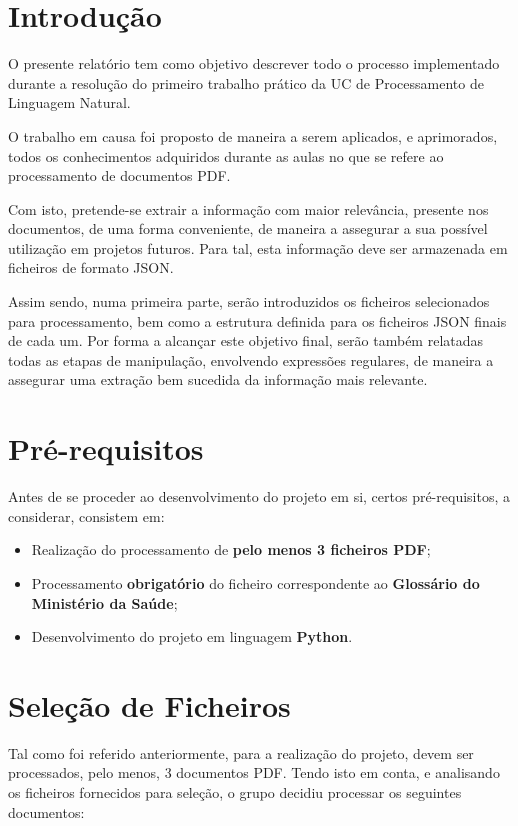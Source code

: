 
\section{Introdução}

O presente relatório tem como objetivo descrever todo o processo implementado durante a resolução do primeiro trabalho prático da UC de Processamento de Linguagem Natural.

O trabalho em causa foi proposto de maneira a serem aplicados, e aprimorados, todos os conhecimentos adquiridos durante as aulas no que se refere ao processamento de documentos PDF.

Com isto, pretende-se extrair a informação com maior relevância, presente nos documentos, de uma forma conveniente, de maneira a assegurar a sua possível utilização em projetos futuros. Para tal, esta informação deve ser armazenada em ficheiros de formato JSON.

Assim sendo, numa primeira parte, serão introduzidos os ficheiros selecionados para processamento, bem como a estrutura definida para os ficheiros JSON finais de cada um. Por forma a alcançar este objetivo final, serão também relatadas todas as etapas de manipulação, envolvendo expressões regulares, de maneira a assegurar uma extração bem sucedida da informação mais relevante.

\section{Pré-requisitos}

Antes de se proceder ao desenvolvimento do projeto em si, certos pré-requisitos, a considerar, consistem em:
\begin{itemize}
    \item Realização do processamento de \textbf{pelo menos 3 ficheiros PDF};
    \item Processamento \textbf{obrigatório} do ficheiro correspondente ao \textbf{Glossário do Ministério da Saúde};
    \item Desenvolvimento do projeto em linguagem \textbf{Python}.
\end{itemize}

\section{Seleção de Ficheiros}
Tal como foi referido anteriormente, para a realização do projeto, devem ser processados, pelo menos, 3 documentos PDF. Tendo isto em conta, e analisando os ficheiros fornecidos para seleção, o grupo decidiu processar os seguintes documentos:

